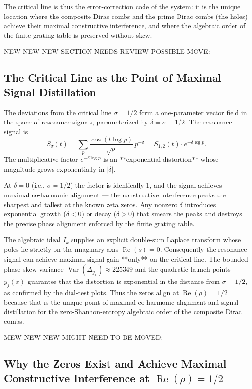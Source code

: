 \documentclass[11pt,a4paper]{article}
\begin{document}
The critical line is thus the error-correction code of the system: it is the unique location where the composite Dirac combs and the prime Dirac combs (the holes) achieve their maximal constructive interference, and where the algebraic order of the finite grating table is preserved without skew.


NEW NEW NEW SECTION NEEDS REVIEW POSSIBLE MOVE: 

\subsection{The Critical Line as the Point of Maximal Signal Distillation}

The deviations from the critical line \(\sigma=1/2\) form a one-parameter vector field in the space of resonance signals, parameterized by \(\delta=\sigma-1/2\). The resonance signal is
\[
S_\sigma(t)=\sum_p\frac{\cos(t\log p)}{\sqrt{p}}\,p^{-\sigma}=S_{1/2}(t)\cdot e^{-\delta\log p}.
\]
The multiplicative factor \(e^{-\delta\log p}\) is an **exponential distortion** whose magnitude grows exponentially in \(|\delta|\).

At \(\delta=0\) (i.e., \(\sigma=1/2\)) the factor is identically 1, and the signal achieves maximal co-harmonic alignment — the constructive interference peaks are sharpest and tallest at the known zeta zeros. Any nonzero \(\delta\) introduces exponential growth (\(\delta<0\)) or decay (\(\delta>0\)) that smears the peaks and destroys the precise phase alignment enforced by the finite grating table.

The algebraic ideal \(I_k\) supplies an explicit double-sum Laplace transform whose poles lie strictly on the imaginary axis \(\operatorname{Re}(s)=0\). Consequently the resonance signal can achieve maximal signal gain **only** on the critical line. The bounded phase-skew variance \(\operatorname{Var}(\Delta_{y_x})\approx225349\) and the quadratic launch points \(y_j(x)\) guarantee that the distortion is exponential in the distance from \(\sigma=1/2\), as confirmed by the dial-test plots. Thus the zeros align at \(\operatorname{Re}(\rho)=1/2\) because that is the unique point of maximal co-harmonic alignment and signal distillation for the zero-Shannon-entropy algebraic order of the composite Dirac combs.


MEW NEW NEW MIGHT NEED TO BE MOVED: 
\subsection{Why the Zeros Exist and Achieve Maximal Constructive Interference at \(\operatorname{Re}(\rho)=1/2\)}
\end{document}
